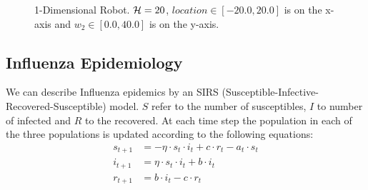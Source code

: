 \begin{figure}[h!]
    \centering
    \caption{1-Dimensional Robot. $ \mathcal{H} = 20 $, $ location \in \left[ -20.0, 20.0 \right]$ is on the x-axis and $ w_2 \in \left[ 0.0, 40.0 \right]$ is on the y-axis. }
    \label{fig:robot1d}
\end{figure}

\subsection{Influenza Epidemiology}
\label{sec:results_ee}

We can describe Influenza epidemics by an SIRS (Susceptible-Infective-Recovered-Susceptible) model. {\footnotesize $ S $} refer to the number of susceptibles, {\footnotesize $ I $} to number of infected and {\footnotesize $ R $} to the recovered. At each time step the population in each of the three populations is updated according to the following equations:
\begin{align*}
    s_{t + 1} &= -\eta \cdot s_t \cdot i_t + c \cdot r_t - a_t \cdot s_t \\
    i_{t + 1} &= \eta \cdot s_t \cdot i_t + b \cdot i_t \\
    r_{t+1} &= b \cdot i_t - c \cdot r_t 
\end{align*}

